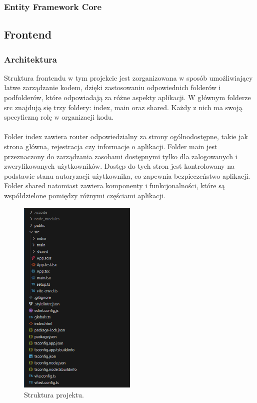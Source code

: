 \documentclass[12pt,a4paper]{article}
\begin{document}
\newpage
\subsubsection{Entity Framework Core}


\newpage
\subsection{Frontend}
\subsubsection{Architektura}

Struktura frontendu w tym projekcie jest zorganizowana w sposób umożliwiający łatwe zarządzanie kodem, dzięki zastosowaniu odpowiednich folderów i podfolderów, które odpowiadają za różne aspekty aplikacji. W głównym folderze src znajdują się trzy foldery: index, main oraz shared. Każdy z nich ma swoją specyficzną rolę w organizacji kodu.
\\\\
Folder index zawiera router odpowiedzialny za strony ogólnodostępne, takie jak strona główna, rejestracja czy informacje o aplikacji. Folder main jest przeznaczony do zarządzania zasobami dostępnymi tylko dla zalogowanych i zweryfikowanych użytkowników. Dostęp do tych stron jest kontrolowany na podstawie stanu autoryzacji użytkownika, co zapewnia bezpieczeństwo aplikacji. Folder shared natomiast zawiera komponenty i funkcjonalności, które są współdzielone pomiędzy różnymi częściami aplikacji.

\begin{figure}[h!]
    \centering
    \includegraphics[width=0.5\textwidth]{zdj/struktura_front.png}
    \caption{Struktura projektu.}
\end{figure}
\end{document}
